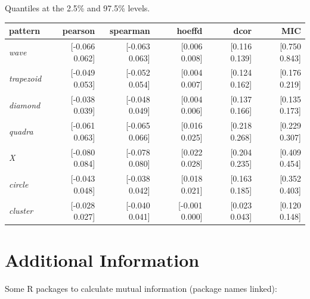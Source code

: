 \documentclass[english,nohyper,titlepage]{tufte-handout}\usepackage{graphicx, color}
\begin{document}
{\vspace{.25cm}
\noindent Quantiles at the 2.5\% and 97.5\% levels.\\
\begin{tabular}{lrrrrr}
pattern & pearson & spearman & hoeffd & dcor & MIC  \\ 
\hline \relax %
\emph{wave}      &    [-0.066         0.062] & [-0.063          0.063] & [0.006        0.008] & [0.116      0.139] & [0.750     0.843]\\ \relax
\emph{trapezoid}     &    [-0.049         0.053] & [-0.052          0.054] & [0.004        0.007] & [0.124      0.162] & [0.176     0.219]\\ \relax
\emph{diamond}     &    [-0.038         0.039] & [-0.048          0.049] & [0.004        0.006] & [0.137      0.166] & [0.135     0.173]\\ \relax
\emph{quadra}    &    [-0.061         0.063] & [-0.065          0.066] & [0.016        0.025] & [0.218      0.268] & [0.229     0.307]\\ \relax
\emph{X}         &    [-0.080         0.084] & [-0.078          0.080] & [0.022        0.028] & [0.204      0.235] & [0.409     0.454]\\ \relax
\emph{circle}    &    [-0.043         0.048] & [-0.038          0.042] & [0.018        0.021] & [0.163      0.185] & [0.352     0.403]\\ \relax
\emph{cluster}   &    [-0.028         0.027] & [-0.040          0.041] & [-0.001        0.000] & [0.023      0.043] & [0.120     0.148]\\
\hline
\end{tabular}
}


\pagebreak



\nocite{szekely_measuring_2007}
\nocite{szekely_brownian_2009}
\nocite{reshef_detecting_2011}
\nocite{fujita_comparing_2009}
\nocite{reshef_equitability_2013}
\nocite{kinney_equitability_2013}
\nocite{simontibs_2011}
\nocite{heller_consistent_2012}

\normalsize

\section{Additional Information}\label{sec:addinfo}
Some R packages to calculate mutual information (package names linked):
\end{document}
